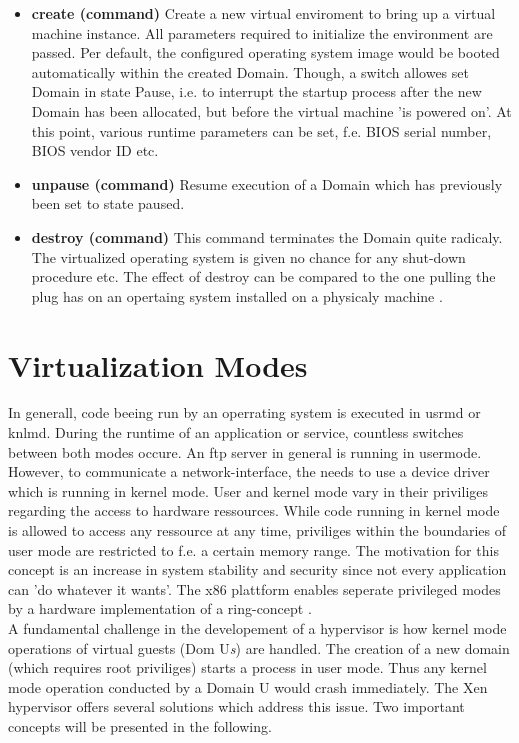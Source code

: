 \begin{itemize}
	\item \textbf{create (command)} Create a new virtual enviroment to bring up a virtual machine instance. All parameters required to initialize the environment are passed. Per default, the configured operating system image would be booted automatically within the created Domain. Though, a switch allowes set Domain in state Pause, i.e. to interrupt the startup process after the new Domain has been allocated, but before the virtual machine 'is powered on'. At this point, various runtime parameters can be set, f.e. BIOS serial number, BIOS vendor ID etc.
	\item \textbf{unpause (command)} Resume execution of a Domain which has previously been set to state paused.
	\item \textbf{destroy (command)} This command terminates the Domain quite radicaly. The virtualized operating system is given no chance for any shut-down procedure etc. The effect of destroy can be compared to the one pulling the plug has on an opertaing system installed on a physicaly machine \cite{xenxl}.
\end{itemize}

\section{Virtualization Modes}\label{sec:virt-modes}
In generall, code beeing run by an operrating system is executed in \gls{usrmd} or \gls{knlmd}. During the runtime of an application or service, countless switches between both modes occure. An ftp server in general is running in usermode. However, to communicate a network-interface, the needs to use a device driver which is running in kernel mode. User and kernel mode vary in their priviliges regarding the access to hardware ressources. While code running in kernel mode is allowed to access any ressource at any time, priviliges within the boundaries of user mode are restricted to f.e. a certain memory range. The motivation for this concept is an increase in system stability and security since not every application can 'do whatever it wants'. The x86 plattform enables seperate privileged modes by a hardware implementation of a ring-concept \cite{guide2017intel}.\\
A fundamental challenge in the developement of a hypervisor is how kernel mode operations of virtual guests (Dom U{\small \textit{s}}) are handled. The creation of a new domain (which requires \gls{root} priviliges) starts a process in user mode. Thus any kernel mode operation conducted by a Domain U would crash immediately. The Xen hypervisor offers several solutions which address this issue. Two important concepts will be presented in the following.  


